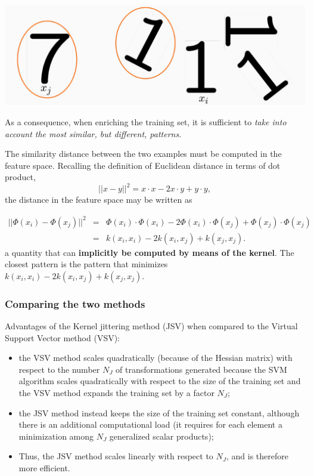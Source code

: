 \documentclass[10pt]{report}
\begin{document}
\begin{center}
\includegraphics[width=.9\linewidth]{./pics/svm/kernel-jittering.jpg}
\end{center}

As a consequence, when enriching the training set, it is sufficient to \emph{take
into account the most similar, but different, patterns}.

The similarity distance between the two examples must be computed in the feature
space. Recalling the definition of Euclidean distance in terms of dot product,
$$||x - y||^2 = x \cdot x - 2x \cdot y + y \cdot y,$$ the distance in the feature space may be written as

\begin{eqnarray}\nonumber
||\Phi(x_i) - \Phi(x_j)||^2 & = & \Phi(x_i)\cdot\Phi(x_i) - 2 \Phi(x_i)\cdot \Phi(x_j) + \Phi(x_j)\cdot \Phi(x_j) \\\nonumber
                            & = & k(x_i, x_i) - 2k(x_i, x_j) + k(x_j, x_j).
\end{eqnarray}
a quantity that can \textbf{implicitly be computed by means of the kernel}. The closest
pattern is the pattern that minimizes \(k(x_i, x_i) - 2k(x_i, x_j) + k(x_j,
x_j)\).

\subsubsection{Comparing the two methods}
\label{sec:org4f23a4b}
Advantages of the Kernel jittering method (JSV) when compared to the Virtual
Support Vector method (VSV):

\begin{itemize}
\item the VSV method scales quadratically (because of the Hessian matrix) with respect to the number \(N_J\) of transformations generated because the SVM algorithm scales quadratically with respect to the size of the training set and the VSV method expands the training set by a factor \(N_J\);
\item the JSV method instead keeps the size of the training set constant, although there is an additional computational load (it requires for each element a minimization among \(N_J\) generalized scalar products);
\item Thus, the JSV method scales linearly with respect to \(N_J\), and is therefore more efficient.
\end{itemize}
\end{document}
